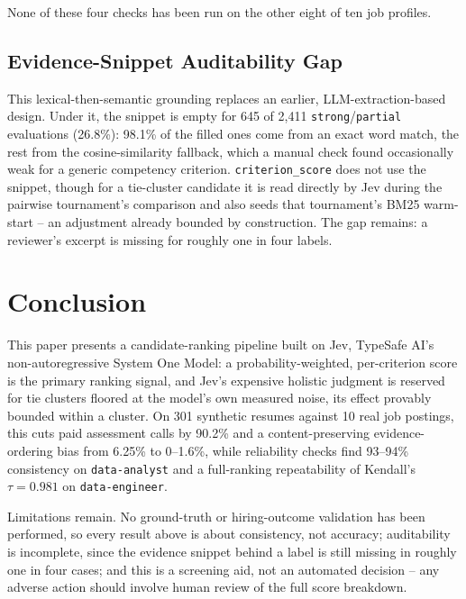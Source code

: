 \documentclass[journal]{IEEEtran}
\begin{document}
None of these four checks has been run on the other eight of ten job profiles.

\subsection{Evidence-Snippet Auditability Gap}
This lexical-then-semantic grounding replaces an earlier, LLM-extraction-based design. Under it, the snippet is empty for 645 of 2,411 \texttt{strong}/\texttt{partial} evaluations (26.8\%): 98.1\% of the filled ones come from an exact word match, the rest from the cosine-similarity fallback, which a manual check found occasionally weak for a generic competency criterion. \texttt{criterion\_score} does not use the snippet, though for a tie-cluster candidate it is read directly by Jev during the pairwise tournament's comparison and also seeds that tournament's BM25 warm-start -- an adjustment already bounded by construction. The gap remains: a reviewer's excerpt is missing for roughly one in four labels.

\section{Conclusion}
This paper presents a candidate-ranking pipeline built on Jev, TypeSafe AI's non-autoregressive System One Model: a probability-weighted, per-criterion score is the primary ranking signal, and Jev's expensive holistic judgment is reserved for tie clusters floored at the model's own measured noise, its effect provably bounded within a cluster. On 301 synthetic resumes against 10 real job postings, this cuts paid assessment calls by 90.2\% and a content-preserving evidence-ordering bias from 6.25\% to 0--1.6\%, while reliability checks find 93--94\% consistency on \texttt{data-analyst} and a full-ranking repeatability of Kendall's $\tau=0.981$ on \texttt{data-engineer}.

Limitations remain. No ground-truth or hiring-outcome validation has been performed, so every result above is about consistency, not accuracy; auditability is incomplete, since the evidence snippet behind a label is still missing in roughly one in four cases; and this is a screening aid, not an automated decision -- any adverse action should involve human review of the full score breakdown.
\end{document}
